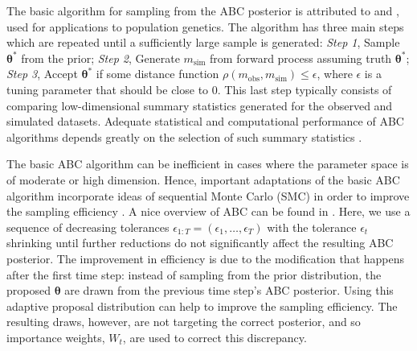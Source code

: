 \documentclass[12pt]{article}
\newcommand{\btheta}{\boldsymbol{\theta}}
\newcommand{\msim}{m_{\text{sim}}}
\newcommand{\mobs}{m_{\text{obs}}}
\begin{document}
The basic algorithm for sampling from the ABC posterior is attributed to 
\cite{TavareEtAl1997} and \cite{PitchardEtAl1999}, used for applications to population 
genetics. The algorithm has three main steps which are repeated until a sufficiently
large sample is generated:
\emph{Step 1}, Sample $\btheta^*$ from the prior; \emph{Step 2}, 
Generate $\msim$ from forward process assuming truth $\btheta^*$; 
 \emph{Step 3},  
Accept $\btheta^*$ if some distance function $\rho(\mobs, \msim) \leq \epsilon$, where $\epsilon$ is a tuning parameter that should be close to 0.
This last step typically consists of comparing low-dimensional summary statistics generated
for the observed and simulated datasets. 
Adequate statistical and computational performance of ABC algorithms depends greatly on the
selection of such summary statistics
\citep{JoyceMarjoram2008,BlumFrancois2010, Blum2010, FearnheadPrangle2012, BlumEtAl2013}.

The basic ABC algorithm can be inefficient in cases where the parameter space is of moderate
or high dimension.
Hence, important adaptations of the basic ABC algorithm incorporate ideas of sequential Monte Carlo (SMC) in 
order to improve the sampling efficiency \citep{MarjoramEtAl2003,SissonEtAl2007,beaumont2009, DelMoralEtAl2011}.  A nice overview of ABC can be found in \cite{MarinEtAl2012}.  
Here, we use a sequence of decreasing tolerances $\epsilon_{1:T} = (\epsilon_1, \ldots, \epsilon_T)$ 
with the tolerance $\epsilon_t$ shrinking until further reductions do not significantly affect the 
resulting ABC posterior.
The improvement in efficiency is due to the modification that happens after the first time step: 
instead of sampling from the prior distribution, the proposed $\btheta$ are drawn from the previous time step's ABC posterior.  Using this adaptive proposal distribution can help to improve the sampling efficiency.  The resulting draws, however, are not targeting the correct posterior, and so importance weights, $W_t$, are used to correct this discrepancy.

\end{document}
